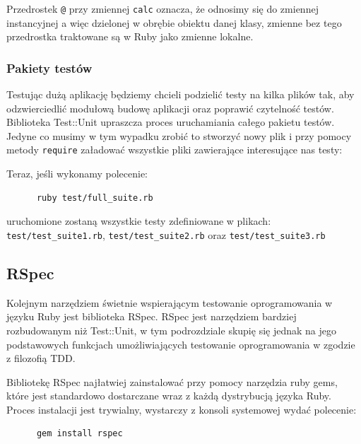     
    
    Przedrostek \verb+@+ przy zmiennej \verb+calc+ oznacza, że odnosimy się do zmiennej instancyjnej a więc dzielonej w obrębie obiektu danej klasy, zmienne bez tego przedrostka traktowane są w Ruby jako zmienne lokalne.
    
    \subsubsection{Pakiety testów}
    Testując dużą aplikację będziemy chcieli podzielić testy na kilka plików tak, aby odzwierciedlić modułową budowę aplikacji oraz poprawić czytelność testów. Biblioteka Test::Unit upraszcza proces uruchamiania całego pakietu testów. Jedyne co musimy w tym wypadku zrobić to stworzyć nowy plik i przy pomocy metody \verb+require+ załadować wszystkie pliki zawierające interesujące nas testy:
    
    
    
    Teraz, jeśli wykonamy polecenie:
    
    \begin{verbatim}
      ruby test/full_suite.rb
    \end{verbatim}
    
    uruchomione zostaną wszystkie testy zdefiniowane w plikach: \verb+test/test_suite1.rb+, \verb+test/test_suite2.rb+ oraz \verb+test/test_suite3.rb+
    
    \subsection{RSpec}
    
    Kolejnym narzędziem świetnie wspierającym testowanie oprogramowania w języku Ruby jest biblioteka RSpec. RSpec jest narzędziem bardziej rozbudowanym niż Test::Unit, w tym podrozdziale skupię się jednak na jego podstawowych funkcjach umożliwiających testowanie oprogramowania w zgodzie z filozofią TDD.
    
    Bibliotekę RSpec najłatwiej zainstalować przy pomocy narzędzia ruby gems, które jest standardowo dostarczane wraz z każdą dystrybucją języka Ruby. Proces instalacji jest trywialny, wystarczy z konsoli systemowej wydać polecenie:
    
    \begin{verbatim}
      gem install rspec
    \end{verbatim}
    
